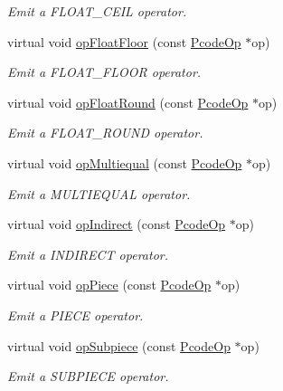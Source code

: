 \begin{DoxyCompactItemize}
\begin{DoxyCompactList}\small\item\em Emit a F\+L\+O\+A\+T\+\_\+\+C\+E\+IL operator. \end{DoxyCompactList}\item 
virtual void \mbox{\hyperlink{class_print_c_a20f64d93540004a560f632bdc65ef8b9}{op\+Float\+Floor}} (const \mbox{\hyperlink{class_pcode_op}{Pcode\+Op}} $\ast$op)
\begin{DoxyCompactList}\small\item\em Emit a F\+L\+O\+A\+T\+\_\+\+F\+L\+O\+OR operator. \end{DoxyCompactList}\item 
virtual void \mbox{\hyperlink{class_print_c_a2aad6c07d0554baab8dfffc3cd18ef99}{op\+Float\+Round}} (const \mbox{\hyperlink{class_pcode_op}{Pcode\+Op}} $\ast$op)
\begin{DoxyCompactList}\small\item\em Emit a F\+L\+O\+A\+T\+\_\+\+R\+O\+U\+ND operator. \end{DoxyCompactList}\item 
virtual void \mbox{\hyperlink{class_print_c_ae84a85e7b884c91e4e96739d159c2b61}{op\+Multiequal}} (const \mbox{\hyperlink{class_pcode_op}{Pcode\+Op}} $\ast$op)
\begin{DoxyCompactList}\small\item\em Emit a M\+U\+L\+T\+I\+E\+Q\+U\+AL operator. \end{DoxyCompactList}\item 
virtual void \mbox{\hyperlink{class_print_c_abb10837d3ba1eea3582bceeb48b682c0}{op\+Indirect}} (const \mbox{\hyperlink{class_pcode_op}{Pcode\+Op}} $\ast$op)
\begin{DoxyCompactList}\small\item\em Emit a I\+N\+D\+I\+R\+E\+CT operator. \end{DoxyCompactList}\item 
virtual void \mbox{\hyperlink{class_print_c_aed941322ca9a2b52903de41d31724fbd}{op\+Piece}} (const \mbox{\hyperlink{class_pcode_op}{Pcode\+Op}} $\ast$op)
\begin{DoxyCompactList}\small\item\em Emit a P\+I\+E\+CE operator. \end{DoxyCompactList}\item 
virtual void \mbox{\hyperlink{class_print_c_a30d7ef1704516edbe3e014e86efad5cc}{op\+Subpiece}} (const \mbox{\hyperlink{class_pcode_op}{Pcode\+Op}} $\ast$op)
\begin{DoxyCompactList}\small\item\em Emit a S\+U\+B\+P\+I\+E\+CE operator. \end{DoxyCompactList}\item 

\end{DoxyCompactItemize}
